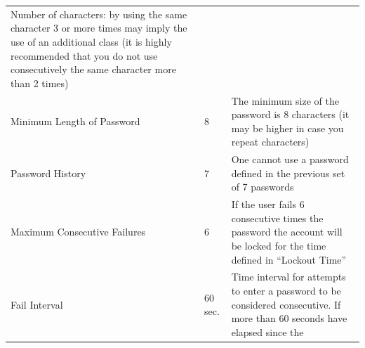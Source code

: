 \documentclass[]{book}
\begin{document}
\begin{longtable}[]{@{}lll@{}}
\begin{minipage}[t]{0.30\columnwidth}
Number of characters:
by using the same
character 3 or more
times may imply the
use of an additional
class (it is highly
recommended that you
do not use
consecutively the
same character more
than 2 times)\strut
\end{minipage}\tabularnewline
\begin{minipage}[t]{0.30\columnwidth}\raggedright
Minimum Length of
Password\strut
\end{minipage} & \begin{minipage}[t]{0.30\columnwidth}\raggedright
8\strut
\end{minipage} & \begin{minipage}[t]{0.30\columnwidth}\raggedright
The minimum size of
the password is 8
characters (it may be
higher in case you
repeat characters)\strut
\end{minipage}\tabularnewline
\begin{minipage}[t]{0.30\columnwidth}\raggedright
Password History\strut
\end{minipage} & \begin{minipage}[t]{0.30\columnwidth}\raggedright
7\strut
\end{minipage} & \begin{minipage}[t]{0.30\columnwidth}\raggedright
One cannot use a
password defined in
the previous set of 7
passwords\strut
\end{minipage}\tabularnewline
\begin{minipage}[t]{0.30\columnwidth}\raggedright
Maximum Consecutive
Failures\strut
\end{minipage} & \begin{minipage}[t]{0.30\columnwidth}\raggedright
6\strut
\end{minipage} & \begin{minipage}[t]{0.30\columnwidth}\raggedright
If the user fails 6
consecutive times the
password the account
will be locked for
the time defined in
``Lockout Time''\strut
\end{minipage}\tabularnewline
\begin{minipage}[t]{0.30\columnwidth}\raggedright
Fail Interval\strut
\end{minipage} & \begin{minipage}[t]{0.30\columnwidth}\raggedright
60 sec.\strut
\end{minipage} & \begin{minipage}[t]{0.30\columnwidth}\raggedright
Time interval for
attempts to enter a
password to be
considered
consecutive. If more
than 60 seconds have
elapsed since the

\end{minipage}
\end{longtable}
\end{document}
